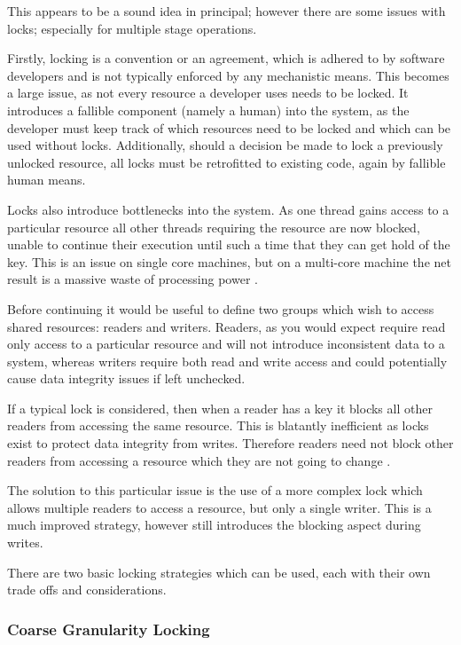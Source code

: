\documentclass[12pt,a4paper]{article}
\begin{document}
This appears to be a sound idea in principal; however there are some issues with locks; especially for multiple stage operations.

Firstly, locking is a convention or an agreement, which is adhered to by software developers and is not typically enforced by any mechanistic means. This becomes a large issue, as not every resource a developer uses needs to be locked. It introduces a fallible component (namely a human) into the system, as the developer must keep track of which resources need to be locked and which can be used without locks. Additionally, should a decision be made to lock a previously unlocked resource, all locks must be retrofitted to existing code, again by fallible human means.

Locks also introduce bottlenecks into the system. As one thread gains access to a particular resource all other threads requiring the resource are now blocked, unable to continue their execution until such a time that they can get hold of the key. This is an issue on single core machines, but on a multi-core machine the net result is a massive waste of processing power \cite{theConcurrencyChallenge}.

Before continuing it would be useful to define two groups which wish to access shared resources: readers and writers. Readers, as you would expect require read only access to a particular resource and will not introduce inconsistent data to a system, whereas writers require both read and write access and could potentially cause data integrity issues if left unchecked.

If a typical lock is considered, then when a reader has a key it blocks all other readers from accessing the same resource. This is blatantly inefficient as locks exist to protect data integrity from writes. Therefore readers need not block other readers from accessing a resource which they are not going to change \cite{javaConcurrency}.

The solution to this particular issue is the use of a more complex lock which allows multiple readers to access a resource, but only a single writer. This is a much improved strategy, however still introduces the blocking aspect during writes.

There are two basic locking strategies which can be used, each with their own trade offs and considerations.

\subsubsection{Coarse Granularity Locking}
\end{document}
